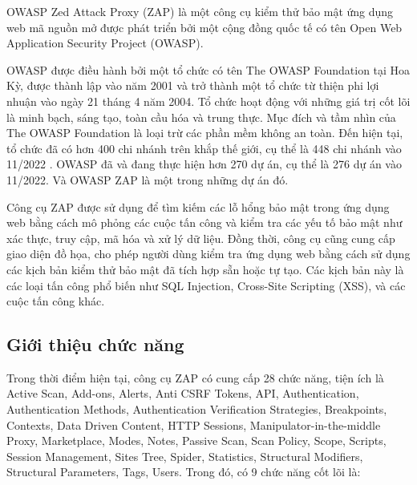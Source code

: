 \tab OWASP Zed Attack Proxy (ZAP) là một công cụ kiểm thử bảo mật ứng dụng web mã nguồn mở được phát triển bởi một cộng đồng quốc tế có tên Open Web Application Security Project (OWASP).
\par

OWASP được điều hành bởi một tổ chức có tên The OWASP Foundation tại Hoa Kỳ, được thành lập vào năm 2001 và trở thành một tổ chức từ thiện phi lợi nhuận vào ngày 21 tháng 4 năm 2004.
Tổ chức hoạt động với những giá trị cốt lõi là minh bạch, sáng tạo, toàn cầu hóa và trung thực.
Mục đích và tầm nhìn của The OWASP Foundation là loại trừ các phần mềm không an toàn.
Đến hiện tại, tổ chức đã có hơn 400 chi nhánh trên khắp thế giới, cụ thể là 448 chi nhánh vào 11/2022 . OWASP đã và đang thực hiện hơn 270 dự án, cụ thể là 276 dự án vào 11/2022. Và OWASP ZAP là một trong những dự án đó.
\par

Công cụ ZAP được sử dụng để tìm kiếm các lỗ hổng bảo mật trong ứng dụng web bằng cách mô phỏng các cuộc tấn công và kiểm tra các yếu tố bảo mật như xác thực, truy cập, mã hóa và xử lý dữ liệu.
Đồng thời, công cụ cũng cung cấp giao diện đồ họa, cho phép người dùng kiểm tra ứng dụng web bằng cách sử dụng các kịch bản kiểm thử bảo mật đã tích hợp sẵn hoặc tự tạo.
Các kịch bản này là các loại tấn công phổ biến như SQL Injection, Cross-Site Scripting (XSS), và các cuộc tấn công khác.

\subsection{Giới thiệu chức năng} \label{subsec:IntroFunc}

\tab Trong thời điểm hiện tại, công cụ ZAP có cung cấp 28 chức năng, tiện ích là Active Scan, Add-ons, Alerts, Anti CSRF Tokens, API, Authentication, Authentication Methods, Authentication Verification Strategies, Breakpoints, Contexts, Data Driven Content, HTTP Sessions, Manipulator-in-the-middle Proxy, Marketplace, Modes, Notes, Passive Scan, Scan Policy, Scope, Scripts, Session Management, Sites Tree, Spider, Statistics, Structural Modifiers, Structural Parameters, Tags, Users.
Trong đó, có 9 chức năng cốt lõi là:


